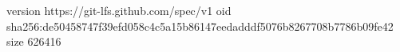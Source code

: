 version https://git-lfs.github.com/spec/v1
oid sha256:de50458747f39efd058c4c5a15b86147eedadddf5076b8267708b7786b09fe42
size 626416
